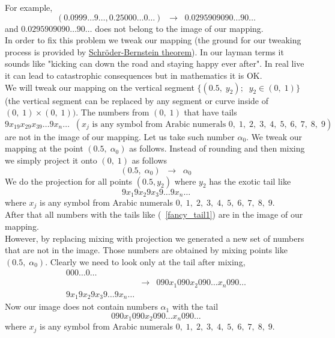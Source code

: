 \documentclass[color=black,11pt]{elegantpaper}
\begin{document}
For example,
$$
(0.0999{\dots}9{\dots}, 0.25000{\dots}0{\dots})\;\; \rightarrow \;\; 0.0295909090{\dots}90{\dots}
$$
and $ 0.0295909090{\dots}90{\dots}$ does not belong to the image of our mapping.\\
In order to fix this problem we tweak our mapping (the ground for our tweaking process is provided by \href{https://en.wikipedia.org/wiki/Schr%C3%B6der%E2%80%93Bernstein_theorem}{Schr\"oder-Bernstein theorem}). In our layman terms it sounds like "kicking can down the road and staying happy ever after". In real live it can lead to catastrophic consequences but in mathematics it is OK.\\
We will tweak our mapping on the vertical segment $\{(0.5,\;y_2);\;\;y_2 \in (0,\;1)\}$ (the vertical segment can be replaced by any segment or curve inside of $ (0,\;1)\times (0,\;1)).$ The numbers from $(0,\;1)$ that have tails 
$$
9x_19x_29x_39{\dots}9x_n\dots\;\;(x_j \mbox{ is any symbol from Arabic numerals }0,\;1,\;2,\;3,\;4,\;5,\;6,\;7,\;8,\;9)
$$
are not in the image of our mapping.  Let us take such number $\alpha_0 .$ We tweak our mapping at the point $(0.5,\;\alpha_0) $ as follows. Instead of rounding and then mixing we simply project it onto $(0,\;1)$ as follows 
$$
(0.5,\; \alpha_0) \;\;\rightarrow \;\; \alpha_0
$$
We do the projection for all points $(0.5, y_{2})$ where $y_{2 }$ has the exotic tail like
\begin{equation}
\label{fancy_tail1}
 9x_{1}9x_{2}9x_{3}9{\dots}9x_{n}{\dots}
\end{equation}
where $x_j $ is any symbol from Arabic numerals $0,\;1,\;2,\;3,\;4,\;5,\;6,\;7,\;8,\;9.$\\
After that all numbers with the tails like (~\ref{fancy_tail1}) are in the image of our mapping.\\
However, by replacing mixing with projection we generated a new set of numbers that are not in the image. Those numbers are obtained by mixing points like $(0.5,\;\alpha_{0}).$ Clearly we need to look only at the tail after mixing,
\begin{eqnarray*}
000{\dots}0{\dots}&&\\
 &\rightarrow &  090x_{1}090x_{2}090{\dots}x_{n}090{\dots}\\
 9x_{1}9x_{2}9x_{3}9{\dots}9x_{n}{\dots} &&
\end{eqnarray*}
Now our image does not contain numbers $\alpha_{1}$ with the tail
$$
090x_{1}090x_{2}090{\dots}x_{n}090{\dots}
$$
where  $x_j $ is any symbol from Arabic numerals $0,\;1,\;2,\;3,\;4,\;5,\;6,\;7,\;8,\;9.$\\
\end{document}
